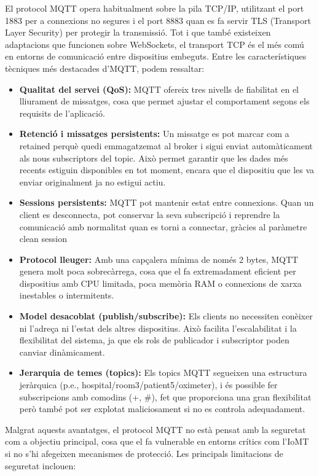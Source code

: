   El protocol MQTT opera habitualment sobre la pila TCP/IP, utilitzant el port 1883 per a connexions no segures i el port 8883 quan es fa servir TLS (Transport Layer Security) per protegir la transmissió. Tot i que també existeixen adaptacions que funcionen sobre WebSockets, el transport TCP és el més comú en entorns de comunicació entre dispositius embeguts.
  Entre les característiques tècniques més destacades d’MQTT, podem ressaltar:
  \begin{itemize}
      \item \textbf{Qualitat del servei (QoS):} MQTT ofereix tres nivells de fiabilitat en el lliurament de missatges, cosa que permet ajustar el comportament segons els requisits de l’aplicació.
      \item \textbf{Retenció i missatges persistents:} Un missatge es pot marcar com a retained perquè quedi emmagatzemat al broker i sigui enviat automàticament als nous subscriptors del topic. Això permet garantir que les dades més recents estiguin disponibles en tot moment, encara que el dispositiu que les va enviar originalment ja no estigui actiu.
      \item \textbf{Sessions persistents:} MQTT pot mantenir estat entre connexions. Quan un client es desconnecta, pot conservar la seva subscripció i reprendre la comunicació amb normalitat quan es torni a connectar, gràcies al paràmetre clean session
      \item \textbf{Protocol lleuger:} Amb una capçalera mínima de només 2 bytes, MQTT genera molt poca sobrecàrrega, cosa que el fa extremadament eficient per dispositius amb CPU limitada, poca memòria RAM o connexions de xarxa inestables o intermitents.
      \item \textbf{Model desacoblat (publish/subscribe):} Els clients no necessiten conèixer ni l’adreça ni l’estat dels altres dispositius. Això facilita l’escalabilitat i la flexibilitat del sistema, ja que els rols de publicador i subscriptor poden canviar dinàmicament.
      \item \textbf{Jerarquia de temes (topics):} Els topics MQTT segueixen una estructura jeràrquica (p.e., hospital/room3/patient5/oximeter), i és possible fer subscripcions amb comodins (+, #), fet que proporciona una gran flexibilitat però també pot ser explotat maliciosament si no es controla adequadament.
  \end{itemize}
  Malgrat aquests avantatges, el protocol MQTT no està pensat amb la seguretat com a objectiu principal, cosa que el fa vulnerable en entorns crítics com l’IoMT si no s’hi afegeixen mecanismes de protecció. Les principals limitacions de seguretat inclouen:
